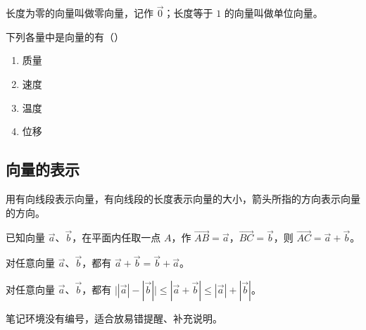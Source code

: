 \begin{definition}[零向量与单位向量]
长度为零的向量叫做零向量，记作 $\vec{0}$；长度等于 $1$ 的向量叫做单位向量。
\end{definition}

\begin{example}
下列各量中是向量的有（\quad）
\begin{enumerate}
    \item 质量
    \item 速度
    \item 温度
    \item 位移
\end{enumerate}
\end{example}

\subsection{向量的表示}

\begin{definition}[向量的几何表示]
用有向线段表示向量，有向线段的长度表示向量的大小，箭头所指的方向表示向量的方向。
\end{definition}

\begin{theorem}[向量加法的三角形法则]
已知向量 $\vec{a}$、$\vec{b}$，在平面内任取一点 $A$，作 $\overrightarrow{AB}=\vec{a}$，$\overrightarrow{BC}=\vec{b}$，则 $\overrightarrow{AC}=\vec{a}+\vec{b}$。
\end{theorem}

\begin{lemma}[向量加法的交换律]
对任意向量 $\vec{a}$、$\vec{b}$，都有 $\vec{a}+\vec{b}=\vec{b}+\vec{a}$。
\end{lemma}

\begin{corollary}[向量不等式]
对任意向量 $\vec{a}$、$\vec{b}$，都有 $\bigl||\vec{a}|-|\vec{b}|\bigr| \leq |\vec{a}+\vec{b}| \leq |\vec{a}|+|\vec{b}|$。
\end{corollary}


\begin{note}
笔记环境没有编号，适合放易错提醒、补充说明。
\end{note}

